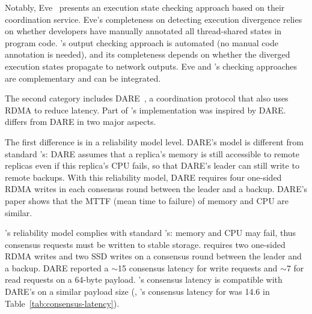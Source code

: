 
Notably, Eve~\cite{eve:osdi12} presents an execution state checking approach 
based on their \paxos coordination service. Eve's completeness on detecting 
execution divergence relies on whether developers have manually annotated all 
thread-shared states in program code. \xxx's output checking approach is 
automated (no manual code annotation is needed), and its completeness depends on 
whether the diverged execution states propagate to network outputs. Eve and 
\xxx's checking approaches are complementary and can be integrated.

The second category includes DARE~\cite{dare:hpdc15}, a coordination protocol 
that also uses RDMA to reduce latency. Part of \xxx's implementation was 
inspired by DARE. \xxx differs from DARE in two major aspects.

The first difference is in a reliability model level. DARE's model is different 
from standard \paxos's: DARE assumes that a replica's memory is still accessible 
to remote replicas even if this replica's CPU fails, so that DARE's leader can 
still write to remote backups. With this reliability model, DARE requires four 
one-sided RDMA writes in each consensus round between the leader and a backup. 
DARE's paper shows that the MTTF (mean time to failure) of memory and CPU are 
similar.

\xxx's reliability model complies with standard \paxos's: memory 
and CPU may fail, thus consensus requests must be written to stable storage. 
\xxx requires two one-sided RDMA writes and two SSD writes on a consensus 
round between the leader and a backup. DARE reported a $\sim$15 \us consensus 
latency for write requests and $\sim$7 \us for read requests on a 64-byte 
payload. \xxx's consensus latency is compatible with DARE's on a similar 
payload size (\eg, \xxx's consensus latency for \ssdb was 14.6 \us in 
Table~\ref{tab:consensus-latency}).

